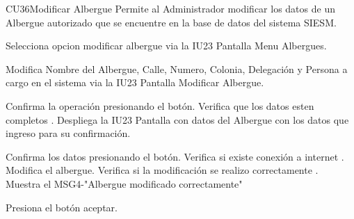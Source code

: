 \begin{UseCase}{CU36}{Modificar Albergue}{
		Permite al Administrador modificar los datos de un Albergue autorizado que se encuentre en la base de datos del sistema SIESM.\\
		
}
	
\end{UseCase}



\begin{UCtrayectoria}
	\item\UCactor Selecciona opcion modificar albergue via la IU23 Pantalla Menu Albergues.
	\item\UCactor Modifica Nombre del Albergue, Calle, Numero, Colonia, Delegación y Persona a cargo en el sistema via la IU23 Pantalla Modificar Albergue.
	\item\UCactor Confirma la operación presionando el botón.
	\UCpaso Verifica que los datos esten completos .
	\UCpaso Despliega la IU23 Pantalla con datos del Albergue con los datos que ingreso para su confirmación.
	\item\UCactor Confirma los datos presionando el botón.
	\UCpaso Verifica si existe conexión a internet .
	\UCpaso Modifica el albergue.
	\UCpaso Verifica si la modificación se realizo correctamente .
	\UCpaso Muestra el MSG4-"Albergue modificado correctamente"
	\item\UCactor Presiona el botón aceptar.
\end{UCtrayectoria}


